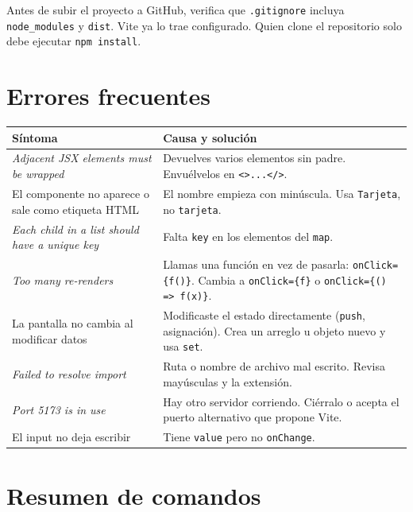 \documentclass[11pt,a4paper]{article}
\newcommand{\cmd}[1]{\texttt{\color{reactdark}#1}}
\begin{document}
\begin{nota}
Antes de subir el proyecto a GitHub, verifica que \cmd{.gitignore} incluya \cmd{node\_modules} y \cmd{dist}. Vite ya lo trae configurado. Quien clone el repositorio solo debe ejecutar \cmd{npm install}.
\end{nota}

\section{Errores frecuentes}

\begin{center}
\small
\begin{tabular}{p{5.6cm} p{8.6cm}}
\toprule
\textbf{Síntoma} & \textbf{Causa y solución} \\
\midrule
\emph{Adjacent JSX elements must be wrapped} & Devuelves varios elementos sin padre. Envuélvelos en \cmd{<>...</>}. \\
\addlinespace
El componente no aparece o sale como etiqueta HTML & El nombre empieza con minúscula. Usa \cmd{Tarjeta}, no \cmd{tarjeta}. \\
\addlinespace
\emph{Each child in a list should have a unique key} & Falta \cmd{key} en los elementos del \cmd{map}. \\
\addlinespace
\emph{Too many re-renders} & Llamas una función en vez de pasarla: \cmd{onClick=\{f()\}}. Cambia a \cmd{onClick=\{f\}} o \cmd{onClick=\{() => f(x)\}}. \\
\addlinespace
La pantalla no cambia al modificar datos & Modificaste el estado directamente (\cmd{push}, asignación). Crea un arreglo u objeto nuevo y usa \cmd{set}. \\
\addlinespace
\emph{Failed to resolve import} & Ruta o nombre de archivo mal escrito. Revisa mayúsculas y la extensión. \\
\addlinespace
\emph{Port 5173 is in use} & Hay otro servidor corriendo. Ciérralo o acepta el puerto alternativo que propone Vite. \\
\addlinespace
El input no deja escribir & Tiene \cmd{value} pero no \cmd{onChange}. \\
\bottomrule
\end{tabular}
\end{center}

\section{Resumen de comandos}
\end{document}
